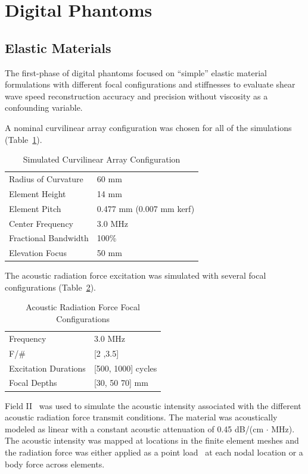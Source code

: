 \section{Digital Phantoms}\label{sect:digital_phantoms}

\subsection{Elastic Materials}
The first-phase of digital phantoms focused on ``simple'' elastic material
formulations with different focal configurations and stiffnesses to evaluate
shear wave speed reconstruction accuracy and precision without viscosity as a
confounding variable.

A nominal curvilinear array configuration was chosen for all of the simulations
(Table~\ref{table:curvilinear}).

\begin{table}[htb!]
    \centering
    \caption{Simulated Curvilinear Array Configuration}
    \begin{tabular}{|l|l|}
    \hline
    Radius of Curvature & 60 mm \\
    Element Height & 14 mm \\
    Element Pitch & 0.477 mm (0.007 mm kerf) \\
    Center Frequency & 3.0 MHz \\
    Fractional Bandwidth & 100\% \\
    Elevation Focus & 50 mm \\
    \hline
    \end{tabular}
\label{table:curvilinear}
\end{table}

The acoustic radiation force excitation was simulated with several focal configurations (Table~\ref{table:arf}).

\begin{table}[htb!]
    \centering
    \caption{Acoustic Radiation Force Focal Configurations}
    \begin{tabular}{|l|l|}
    \hline
    Frequency & 3.0 MHz \\
    F/\# & [2 ,3.5] \\
    Excitation Durations & [500, 1000] cycles \\
    Focal Depths & [30, 50 70] mm \\
    \hline
    \end{tabular}
\label{table:arf}
\end{table}

Field II~\cite{Jensen1992} was used to simulate the acoustic intensity
associated with the different acoustic radiation force transmit conditions.
The material was acoustically modeled as linear with a constant acoustic
attenuation of 0.45 dB/(cm $\cdot$ MHz).  The acoustic intensity was mapped at
locations in the finite element meshes and the radiation force was either
applied as a point load~\cite{Palmeri2005} at each nodal location or a body
force across elements.

